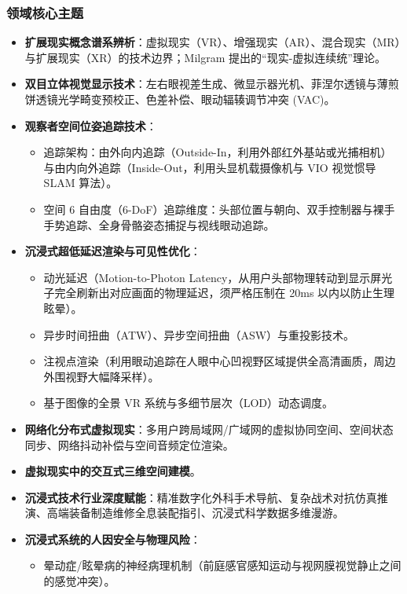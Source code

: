 \subsubsection{领域核心主题}
\begin{itemize}
    \item \textbf{扩展现实概念谱系辨析}：虚拟现实（VR）、增强现实（AR）、混合现实（MR）与扩展现实（XR）的技术边界；Milgram 提出的“现实-虚拟连续统”理论。
    \item \textbf{双目立体视觉显示技术}：左右眼视差生成、微显示器光机、菲涅尔透镜与薄煎饼透镜光学畸变预校正、色差补偿、眼动辐辏调节冲突 (VAC)。
    \item \textbf{观察者空间位姿追踪技术}：
    \begin{itemize}
        \item 追踪架构：由外向内追踪（Outside-In，利用外部红外基站或光捕相机）与由内向外追踪（Inside-Out，利用头显机载摄像机与 VIO 视觉惯导 SLAM 算法）。
        \item 空间 6 自由度（6-DoF）追踪维度：头部位置与朝向、双手控制器与裸手手势追踪、全身骨骼姿态捕捉与视线眼动追踪。
    \end{itemize}
    \item \textbf{沉浸式超低延迟渲染与可见性优化}：
    \begin{itemize}
        \item 动光延迟（Motion-to-Photon Latency，从用户头部物理转动到显示屏光子完全刷新出对应画面的物理延迟，须严格压制在 20ms 以内以防止生理眩晕）。
        \item 异步时间扭曲（ATW）、异步空间扭曲（ASW）与重投影技术。
        \item 注视点渲染（利用眼动追踪在人眼中心凹视野区域提供全高清画质，周边外围视野大幅降采样）。
        \item 基于图像的全景 VR 系统与多细节层次（LOD）动态调度。
    \end{itemize}
    \item \textbf{网络化分布式虚拟现实}：多用户跨局域网/广域网的虚拟协同空间、空间状态同步、网络抖动补偿与空间音频定位渲染。
    \item \textbf{虚拟现实中的交互式三维空间建模}。
    \item \textbf{沉浸式技术行业深度赋能}：精准数字化外科手术导航、复杂战术对抗仿真推演、高端装备制造维修全息装配指引、沉浸式科学数据多维漫游。
    \item \textbf{沉浸式系统的人因安全与物理风险}：
    \begin{itemize}
        \item 晕动症/眩晕病的神经病理机制（前庭感官感知运动与视网膜视觉静止之间的感觉冲突）。

\end{itemize}
\end{itemize}
